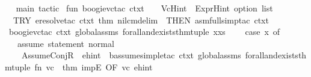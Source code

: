 \begin{isabellebody}
{\isacartoucheclose}\isanewline
\isanewline
{}\isamarkupfalse%
\ {\isacartoucheopen}\isanewline
{\isacharparenleft}{\kern0pt}{\isacharasterisk}{\kern0pt}{\isacharasterisk}{\kern0pt}\ main\ tactic\ {\isacharasterisk}{\kern0pt}{\isacharasterisk}{\kern0pt}{\isacharparenright}{\kern0pt}\isanewline
\isanewline
fun\ boogie{\isacharunderscore}{\kern0pt}vc{\isacharunderscore}{\kern0pt}tac\ ctxt\ {\isacharunderscore}{\kern0pt}\ {\isacharunderscore}{\kern0pt}\ {\isacharparenleft}{\kern0pt}{\isacharbrackleft}{\kern0pt}{\isacharbrackright}{\kern0pt}{\isacharcolon}{\kern0pt}\ {\isacharparenleft}{\kern0pt}VcHint\ {\isacharasterisk}{\kern0pt}\ {\isacharparenleft}{\kern0pt}ExprHint\ option{\isacharparenright}{\kern0pt}{\isacharparenright}{\kern0pt}\ list{\isacharparenright}{\kern0pt}\ {\isacharequal}{\kern0pt}\isanewline
\ \ TRY\ {\isacharparenleft}{\kern0pt}eresolve{\isacharunderscore}{\kern0pt}tac\ ctxt\ {\isacharbrackleft}{\kern0pt}{\isacharat}{\kern0pt}{\isacharbraceleft}{\kern0pt}thm\ nil{\isacharunderscore}{\kern0pt}cmd{\isacharunderscore}{\kern0pt}elim{\isacharbraceright}{\kern0pt}{\isacharbrackright}{\kern0pt}\ {}\ THEN\ asm{\isacharunderscore}{\kern0pt}full{\isacharunderscore}{\kern0pt}simp{\isacharunderscore}{\kern0pt}tac\ ctxt\ {}{\isacharparenright}{\kern0pt}\isanewline
{\isacharbar}{\kern0pt}\ boogie{\isacharunderscore}{\kern0pt}vc{\isacharunderscore}{\kern0pt}tac\ ctxt\ global{\isacharunderscore}{\kern0pt}assms\ forall{\isacharunderscore}{\kern0pt}and{\isacharunderscore}{\kern0pt}exists{\isacharunderscore}{\kern0pt}thm{\isacharunderscore}{\kern0pt}tuple\ {\isacharparenleft}{\kern0pt}x{\isacharcolon}{\kern0pt}{\isacharcolon}{\kern0pt}xs{\isacharparenright}{\kern0pt}\ {\isacharequal}{\kern0pt}\ \isanewline
\ \ {\isacharparenleft}{\kern0pt}case\ x\ of\isanewline
\ \ {\isacharparenleft}{\kern0pt}{\isacharasterisk}{\kern0pt}\ assume\ statement\ normal\ {\isacharasterisk}{\kern0pt}{\isacharparenright}{\kern0pt}\isanewline
\ \ \ \ {\isacharparenleft}{\kern0pt}AssumeConjR\ {}{\isacharcomma}{\kern0pt}\ ehint{\isacharparenright}{\kern0pt}\ {\isacharequal}{\kern0pt}{\isachargreater}{\kern0pt}\ b{\isacharunderscore}{\kern0pt}assume{\isacharunderscore}{\kern0pt}simple{\isacharunderscore}{\kern0pt}tac\ ctxt\ global{\isacharunderscore}{\kern0pt}assms\ forall{\isacharunderscore}{\kern0pt}and{\isacharunderscore}{\kern0pt}exists{\isacharunderscore}{\kern0pt}thm{\isacharunderscore}{\kern0pt}tuple\ {\isacharparenleft}{\kern0pt}fn\ {\isacharparenleft}{\kern0pt}vc{\isacharparenright}{\kern0pt}\ {\isacharequal}{\kern0pt}{\isachargreater}{\kern0pt}\ {\isacharat}{\kern0pt}{\isacharbraceleft}{\kern0pt}thm\ impE{\isacharbraceright}{\kern0pt}\ OF\ {\isacharbrackleft}{\kern0pt}vc{\isacharbrackright}{\kern0pt}{\isacharparenright}{\kern0pt}\ ehint\ {}\isanewline

\end{isabellebody}
